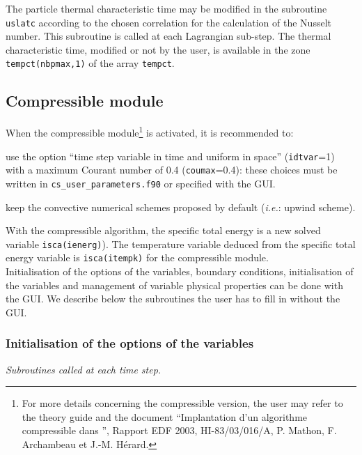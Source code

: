 {{{

\noindent
The particle thermal characteristic time may be modified in the subroutine \texttt{uslatc} according to the chosen correlation for the calculation of the
Nusselt number. This subroutine is called at each Lagrangian sub-step. The thermal characteristic time, modified or not by the user, is available in the zone \texttt{tempct(nbpmax,1)} of the array \texttt{tempct}.


\subsection{Compressible module}

When the compressible module\footnote{For more details concerning the
compressible version, the user may refer to the theory guide \cite{theory} and the document ``Implantation
d'un algorithme compressible dans \CS'', Rapport EDF 2003,
HI-83/03/016/A, P. Mathon, F. Archambeau et J.-M. H\'erard.} is
activated, it is recommended to:
\begin{list}{-}{}
 \item use the option ``time step variable in time and uniform in
       space'' (\texttt{idtvar}=1) with a maximum Courant number of 0.4
       (\texttt{coumax}=0.4): these choices must be written in \texttt{cs\_user\_parameters.f90}
       or specified with the GUI.
 \item keep the convective numerical schemes proposed by default (\textit{i.e.}: upwind scheme).
\end{list}
With the compressible algorithm, the specific total energy is a new solved variable
\texttt{isca(ienerg)}). The temperature variable deduced from the specific
total energy variable is \texttt{isca(itempk)} for the compressible module.\\
Initialisation of the options of the variables, boundary conditions, initialisation of the variables and
management of variable physical properties can be done with the GUI. We describe below the subroutines
the user has to fill in without the GUI.

\subsubsection{ Initialisation of the options of the variables}
\label{prg_uscfx12}%
\noindent
\textit{Subroutines called at each time step.}

}}}
